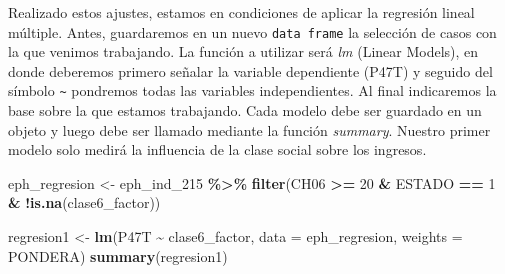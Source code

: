 \documentclass[
]{article}
\newenvironment{Shaded}{\begin{snugshade}}{\end{snugshade}}
\newcommand{\AttributeTok}[1]{\textcolor[rgb]{0.13,0.29,0.53}{#1}}
\newcommand{\DecValTok}[1]{\textcolor[rgb]{0.00,0.00,0.81}{#1}}
\newcommand{\FunctionTok}[1]{\textcolor[rgb]{0.13,0.29,0.53}{\textbf{#1}}}
\newcommand{\NormalTok}[1]{#1}
\newcommand{\OtherTok}[1]{\textcolor[rgb]{0.56,0.35,0.01}{#1}}
\newcommand{\SpecialCharTok}[1]{\textcolor[rgb]{0.81,0.36,0.00}{\textbf{#1}}}
\newcommand{\StringTok}[1]{\textcolor[rgb]{0.31,0.60,0.02}{#1}}
\begin{document}
\begin{Shaded}
\end{Shaded}

Realizado estos ajustes, estamos en condiciones de aplicar la regresión lineal múltiple. Antes, guardaremos en un nuevo \texttt{data\ frame} la selección de casos con la que venimos trabajando. La función a utilizar será \emph{lm} (Linear Models), en donde deberemos primero señalar la variable dependiente (P47T) y seguido del símbolo \texttt{\textasciitilde{}} pondremos todas las variables independientes. Al final indicaremos la base sobre la que estamos trabajando. Cada modelo debe ser guardado en un objeto y luego debe ser llamado mediante la función \emph{summary}. Nuestro primer modelo solo medirá la influencia de la clase social sobre los ingresos.

\begin{Shaded}
\begin{Highlighting}[]
\NormalTok{eph\_regresion }\OtherTok{\textless{}{-}}\NormalTok{ eph\_ind\_215 }\SpecialCharTok{\%\textgreater{}\%}
    \FunctionTok{filter}\NormalTok{(CH06 }\SpecialCharTok{\textgreater{}=} \DecValTok{20} \SpecialCharTok{\&}\NormalTok{ ESTADO }\SpecialCharTok{==} \DecValTok{1} \SpecialCharTok{\&} \SpecialCharTok{!}\FunctionTok{is.na}\NormalTok{(clase6\_factor))}

\NormalTok{regresion1 }\OtherTok{\textless{}{-}} \FunctionTok{lm}\NormalTok{(P47T }\SpecialCharTok{\textasciitilde{}}\NormalTok{ clase6\_factor, }\AttributeTok{data =}\NormalTok{ eph\_regresion, }\AttributeTok{weights =}\NormalTok{ PONDERA)}
\FunctionTok{summary}\NormalTok{(regresion1)}
\end{Highlighting}
\end{Shaded}
\end{document}
